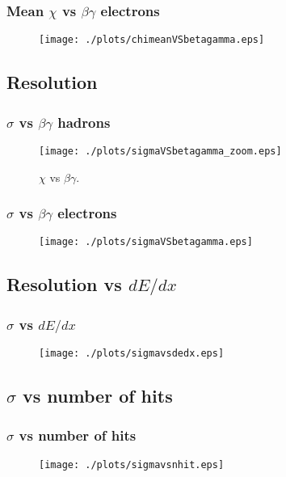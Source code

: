 \documentclass{beamer}
\begin{document}
\begin{frame}\frametitle{Mean $\chi$ vs $\beta \gamma$ electrons}
\begin{figure}
\texttt{[image: ./plots/chimeanVSbetagamma.eps]} 
\end{figure}
\end{frame}

\subsection{Resolution}
\begin{frame}\frametitle{$\sigma$ vs $\beta \gamma$ hadrons}
\begin{figure}
\texttt{[image: ./plots/sigmaVSbetagamma\_zoom.eps]} 
\caption{$\chi$ vs $\beta \gamma$.}
\end{figure}
\end{frame}

\begin{frame}\frametitle{$\sigma$ vs $\beta \gamma$ electrons}
\begin{figure}
\texttt{[image: ./plots/sigmaVSbetagamma.eps]} 
\end{figure}
\end{frame}

\subsection{Resolution vs \texorpdfstring{$dE/dx$}{dE/dx}}
\begin{frame}\frametitle{$\sigma$ vs $dE/dx$ }
\begin{figure}
\texttt{[image: ./plots/sigmavsdedx.eps]} 
\end{figure}
\end{frame}

\subsection{\texorpdfstring{$\sigma$}{sigma} vs number of hits}
\begin{frame}\frametitle{$\sigma$ vs number of hits }
\begin{figure}
\texttt{[image: ./plots/sigmavsnhit.eps]} 
\end{figure}
\end{frame}
\end{document}
